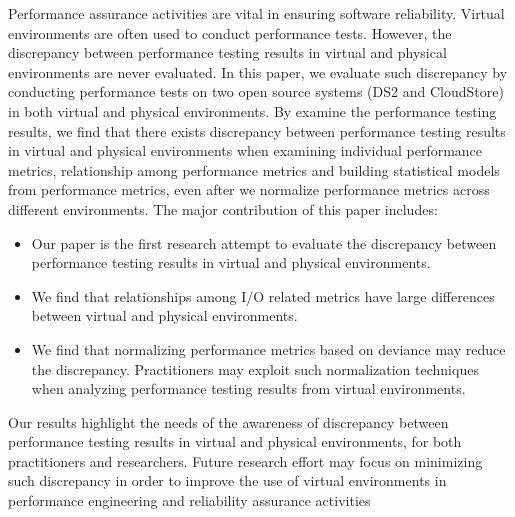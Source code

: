 Performance assurance activities are vital in ensuring software reliability. Virtual environments are often used to conduct performance tests. However, the discrepancy between performance testing results in virtual and physical environments are never evaluated. In this paper, we evaluate such discrepancy by conducting performance tests on two open source systems (DS2 and CloudStore) in both virtual and physical environments. By examine the performance testing results, we find that there exists discrepancy between performance testing results in virtual and physical environments when examining individual performance metrics, relationship among performance metrics and building statistical models from performance metrics, even after we normalize performance metrics across different environments. The major contribution of this paper includes: 
\begin{itemize} \itemsep -0.4pt 
	\item Our paper is the first research attempt to evaluate the discrepancy between performance testing results in virtual and physical environments.
	\item We find that relationships among I/O related metrics have large differences between virtual and physical environments.
	\item We find that normalizing performance metrics based on deviance may reduce the discrepancy. Practitioners may exploit such normalization techniques when analyzing performance testing results from virtual environments.
\end{itemize}
Our results highlight the needs of the awareness of discrepancy between performance testing results in virtual and physical environments, for both practitioners and researchers. Future research effort may focus on minimizing such discrepancy in order to improve the use of virtual environments in performance engineering and reliability assurance activities



